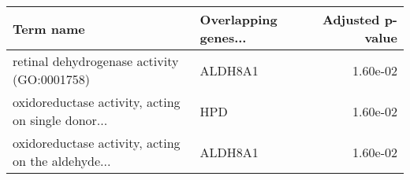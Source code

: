 \begin{tabular}{llr}
\toprule
                                         Term name & Overlapping genes... &  Adjusted p-value \\
\midrule
       retinal dehydrogenase activity (GO:0001758) &              ALDH8A1 &          1.60e-02 \\
oxidoreductase activity, acting on single donor... &                  HPD &          1.60e-02 \\
oxidoreductase activity, acting on the aldehyde... &              ALDH8A1 &          1.60e-02 \\
\bottomrule
\end{tabular}
